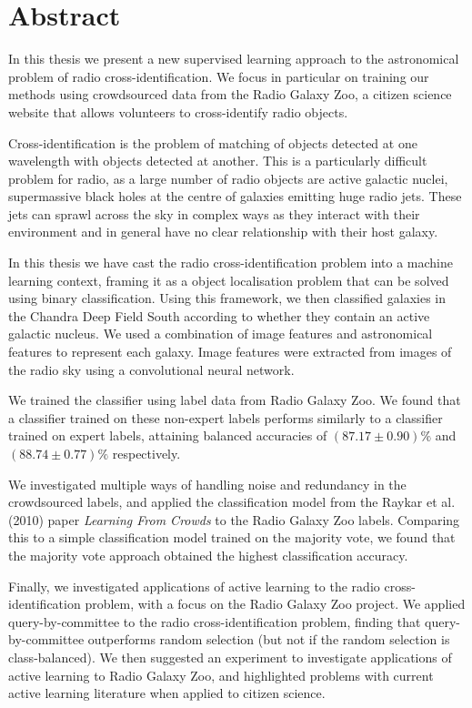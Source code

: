 \chapter*{Abstract}
\label{cha:abstract}

In this thesis we present a new supervised learning approach to the astronomical
problem of radio cross-identification. We focus in particular on training our
methods using crowdsourced data from the Radio Galaxy Zoo, a citizen science
website that allows volunteers to cross-identify radio objects.

Cross-identification is the problem of matching of objects detected at one
wavelength with objects detected at another. This is a particularly difficult
problem for radio, as a large number of radio objects are active galactic
nuclei, supermassive black holes at the centre of galaxies emitting huge radio
jets. These jets can sprawl across the sky in complex ways as they interact with
their environment and in general have no clear relationship with their host
galaxy.

In this thesis we have cast the radio cross-identification problem into a
machine learning context, framing it as a object localisation problem that can
be solved using binary classification. Using this framework, we then classified
galaxies in the Chandra Deep Field South according to whether they contain an
active galactic nucleus. We used a combination of image features and
astronomical features to represent each galaxy. Image features were extracted
from images of the radio sky using a convolutional neural network.

We trained the classifier using label data from Radio Galaxy Zoo. We found that
a classifier trained on these non-expert labels performs similarly to a
classifier trained on expert labels, attaining balanced accuracies of $(87.17 \pm 0.90)\%$ and $(88.74 \pm 0.77)\%$ respectively.

We investigated multiple ways of handling noise and redundancy in the
crowdsourced labels, and applied the classification model from the Raykar et al.
(2010) paper \emph{Learning From Crowds} to the Radio Galaxy Zoo labels.
Comparing this to a simple classification model trained on the majority vote, we
found that the majority vote approach obtained the highest classification
accuracy.

Finally, we investigated applications of active learning to the radio
cross-identification problem, with a focus on the Radio Galaxy Zoo project. We
applied query-by-committee to the radio cross-identification problem, finding
that query-by-committee outperforms random selection (but not if the random
selection is class-balanced). We then suggested an experiment to investigate
applications of active learning to Radio Galaxy Zoo, and highlighted problems
with current active learning literature when applied to citizen science.
